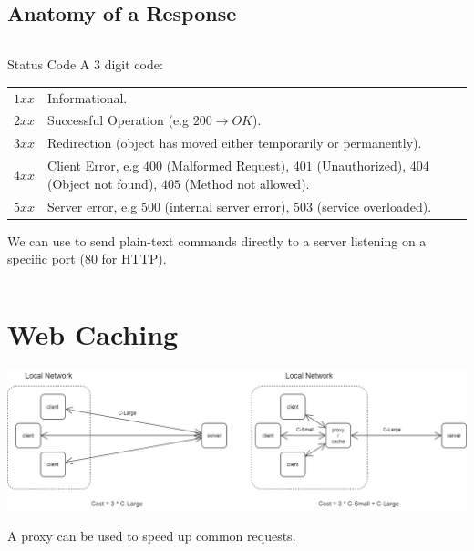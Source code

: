 \subsection{Anatomy of a Response}
\inputminted{HTML}{the_web/code/response.html}
\begin{definitionbox}{Status Code}
    A 3 digit code:
    \begin{center}
        \begin{tabular}{l p{}}
            $1xx$ & Informational.                                                                                                            \\
            $2xx$ & Successful Operation (e.g $200 \to OK$).                                                                                  \\
            $3xx$ & Redirection (object has moved either temporarily or permanently).                                                         \\
            $4xx$ & Client Error,  e.g $400$ (Malformed Request), $401$ (Unauthorized), $404$ (Object not found), $405$ (Method not allowed). \\
            $5xx$ & Server error, e.g $500$ (internal server error), $503$ (service overloaded).                                              \\
        \end{tabular}
    \end{center}
\end{definitionbox}

We can use  to send plain-text commands directly to a server listening on a specific port ($80$ for HTTP).

\inputminted{bash}{the_web/code/telnet_imperial.sh}

\section{Web Caching}
\begin{center}\includegraphics[width=\textwidth]{the_web/images/proxy cache.png}\end{center}
A proxy can be used to speed up common requests.

